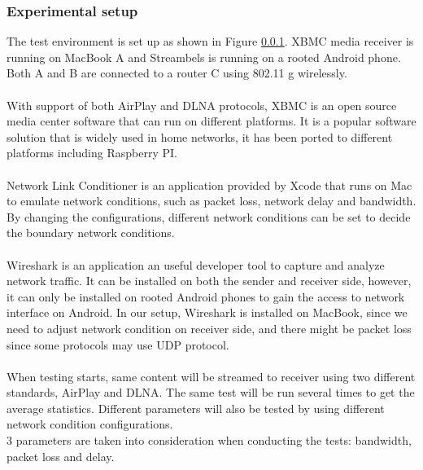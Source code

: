 \subsubsection{Experimental setup}
The test environment is set up as shown in Figure \ref{}. XBMC media receiver is running on MacBook A and Streambels is running on a rooted Android phone. Both A and B are connected to a router C using 802.11 g wirelessly. \\
\\
With support of both AirPlay and DLNA protocols, XBMC is an open source media center software that can run on different platforms. It is a popular software solution that is widely used in home networks, it has been ported to different platforms including Raspberry PI.\\
\\
Network Link Conditioner is an application provided by Xcode that runs on Mac to emulate network conditions, such as packet loss, network delay and bandwidth. By changing the configurations, different network conditions can be set to decide the boundary network conditions.\\
\\
Wireshark is an application an useful developer tool to capture and analyze network traffic. It can be installed on both the sender and receiver side, however, it can only be installed on rooted Android phones to gain the access to network interface on Android. In our setup, Wireshark is installed on MacBook, since we need to adjust network condition on receiver side, and there might be packet loss since some protocols may use UDP protocol.\\
\\
When testing starts, same content will be streamed to receiver using two different standards, AirPlay and DLNA. The same test will be run several times to get the average statistics. Different parameters will also be tested by using different network condition configurations.
\\
3 parameters are taken into consideration when conducting the tests: bandwidth, packet loss and delay. 
